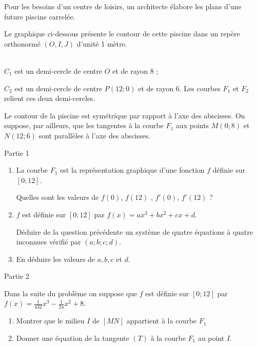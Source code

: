 
%
Pour les besoins d'un centre de loisirs, un architecte élabore les plans d'une future piscine carrelée.
\par
Le graphique ci-dessous présente le contour de cette piscine dans un repère orthonormé $(O,I,J)$ d'unité 1 mètre.

\begin{center}
\end{center}
\\
$C_1$ est un demi-cercle de centre $O$ et de rayon $8$ ;
\par
$C_2$ est un demi-cercle de centre $P(12 ; 0)$ et de rayon $6$. Les courbes $F_1$ et $F_2$ relient ces deux demi-cercles.
\par
Le contour de la piscine est symétrique par rapport à l'axe des abscisses. On suppose, par ailleurs, que les tangentes à la courbe $F_1$ aux points $M(0;8)$ et $N(12;6)$ sont parallèles à l'axe des abscisses.
\begin{h3}Partie 1\end{h3}
\begin{enumerate}
     \item
     La courbe $F_1$ est la représentation graphique d'une fonction $f$ définie sur $[0;12]$.
     \par
     Quelles sont les valeurs de $f(0)$,  $f(12)$ ,  $f'(0)$,  $f'(12)$ ?
     \item
     $f$ est définie sur $[0;12]$ par $f(x)=ax^3+bx^2+cx+d$.
     \par
     Déduire de la question précédente un système de quatre équations à quatre inconnues vérifié par $(a;b;c;d)$.
     \item
     En déduire les valeurs de $a, b, c$ et $d$.
\end{enumerate}
\begin{h3}Partie 2\end{h3}
Dans la suite du problème on suppose que $f$ est définie sur $[0;12]$ par $f(x)=\frac{1}{432}x^3-\frac{1}{24}x^2+8$.
\begin{enumerate}
     \item
     Montrer que le milieu $I$ de $[MN]$ appartient à la courbe $F_1$
     \item
     Donner une équation de la tangente $(T)$  à la courbe $F_1$ au point $I$.
\end{enumerate}
